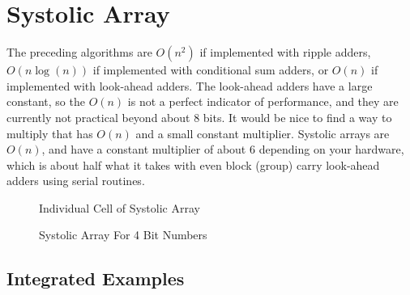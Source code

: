 \chapter{Systolic Array}

The preceding algorithms are $O(n^2)$ if implemented with ripple adders, $O(n\log(n))$ if implemented with conditional sum adders, or $O(n)$ if implemented with look-ahead adders.  The look-ahead adders have a large constant, so the $O(n)$ is not a perfect indicator of performance, and they are currently not practical beyond about 8 bits.  It would be nice to find a way to multiply that has $O(n)$ and a small constant multiplier.  Systolic arrays are $O(n)$, and have a constant multiplier of about 6 depending on your hardware, which is about half what it takes with even block (group) carry look-ahead adders using serial routines.

\begin{figure}[p]
  \SystolicCell
  \caption{Individual Cell of Systolic Array}\label{fig-systolic-cell}
\end{figure}

\begin{figure}[p]
  \SystolicArray
  \caption{Systolic Array For 4 Bit Numbers}\label{fig-systolic-array}
\end{figure}


\section{Integrated Examples}







